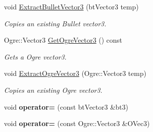 \begin{DoxyCompactItemize}
void \hyperlink{classPhysVector3_a71a78da9e8011cb727010f8ba3acf546}{ExtractBulletVector3} (btVector3 temp)
\begin{DoxyCompactList}\small\item\em Copies an existing Bullet vector3. \item\end{DoxyCompactList}\item 
Ogre::Vector3 \hyperlink{classPhysVector3_a11bb925270d1fa86620e1ad080c507db}{GetOgreVector3} () const 
\begin{DoxyCompactList}\small\item\em Gets a Ogre vector3. \item\end{DoxyCompactList}\item 
void \hyperlink{classPhysVector3_a422acbc95f72d00a26cb477ab7db5e87}{ExtractOgreVector3} (Ogre::Vector3 temp)
\begin{DoxyCompactList}\small\item\em Copies an existing Ogre vector3. \item\end{DoxyCompactList}\item 
\hypertarget{classPhysVector3_a76af5753ff1a65261bcb0d543999eb3e}{
void {\bfseries operator=} (const btVector3 \&bt3)}
\label{da/d11/classPhysVector3_a76af5753ff1a65261bcb0d543999eb3e}

\item 
\hypertarget{classPhysVector3_a00323a54e86ab2e6cf41ddbfbc2a97cd}{
void {\bfseries operator=} (const Ogre::Vector3 \&OVec3)}
\label{da/d11/classPhysVector3_a00323a54e86ab2e6cf41ddbfbc2a97cd}

\end{DoxyCompactItemize}

